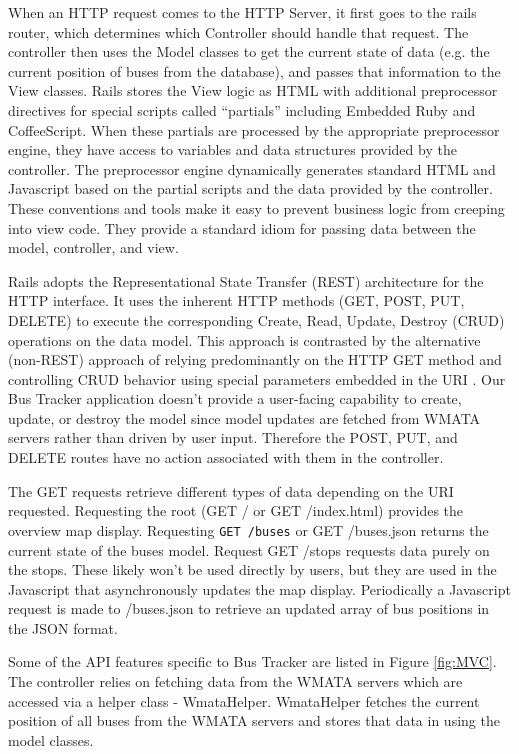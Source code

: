 \documentclass[12pt]{report}
\begin{document}
When an HTTP request comes to the HTTP Server, it first goes to the rails router, which determines which Controller should handle that request.  The controller then uses the Model classes to get the current state of data (e.g. the current position of buses from the database), and passes that information to the View classes.  Rails stores the View logic as HTML with additional preprocessor directives for special scripts called ``partials'' including Embedded Ruby and CoffeeScript.  When these partials are processed by the appropriate preprocessor engine, they have access to variables and data structures provided by the controller.  The preprocessor engine dynamically generates standard HTML and Javascript based on the partial scripts and the data provided by the controller.  These conventions and tools make it easy to prevent business logic from creeping into view code.  They provide a standard idiom for passing data between the model, controller, and view.

Rails adopts the Representational State Transfer (REST) architecture for the HTTP interface.  It uses the inherent HTTP methods (GET, POST, PUT, DELETE) to execute the corresponding Create, Read, Update, Destroy (CRUD) operations on the data model.  This approach is contrasted by the alternative (non-REST) approach of relying predominantly on the HTTP GET method and controlling CRUD behavior using special parameters embedded in the URI \cite{rails}.  Our Bus Tracker application doesn't provide a user-facing capability to create, update, or destroy the model since model updates are fetched from WMATA servers rather than driven by user input.  Therefore the POST, PUT, and DELETE routes have no action associated with them in the controller.  

The GET requests retrieve different types of data depending on the URI requested.  Requesting the root (GET / or GET /index.html) provides the overview map display.  Requesting \lstinline|GET /buses| or GET /buses.json returns the current state of the buses model.  Request GET /stops requests data purely on the stops.  These likely won't be used directly by users, but they are used in the Javascript that asynchronously updates the map display.  Periodically a Javascript request is made to /buses.json to retrieve an updated array of bus positions in the JSON format.  

Some of the API features specific to Bus Tracker are listed in Figure \ref{fig:MVC}.  The controller relies on fetching data from the WMATA servers which  are accessed via a helper class - WmataHelper.  WmataHelper fetches the current position of all buses from the WMATA servers and stores that data in using the model classes. 
\end{document}
